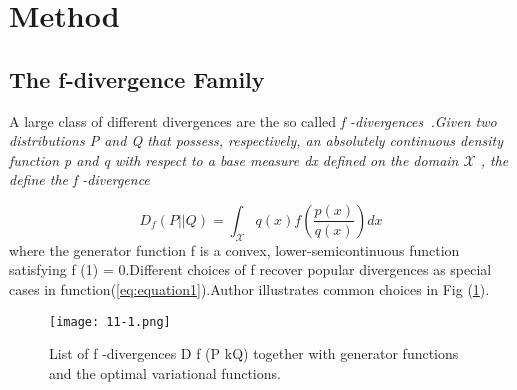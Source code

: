 \documentclass[10pt,letterpaper]{article}
\begin{document}
\section{Method}
\subsection{The f-divergence Family}
\upshape A large class of different divergences are the so called \itshape f \upshape -divergences~\cite{Information_2004_3,divergences_2006_4}.Given two distributions P and Q that possess, respectively, an absolutely continuous density function p and q with respect to a base measure dx defined on the domain $\mathcal{X}$ , the define the \itshape f \upshape -divergence\par
\begin{equation}
D_{f}(P||Q) = \int_{\mathcal{X}} q(x)f(\frac{p(x)}{q(x)}) dx
\label{eq:equation1}
\end{equation}
where the generator function f is a convex, lower-semicontinuous function satisfying f (1) = 0.Different choices of f recover popular divergences as special cases in function(\ref{eq:equation1}).Author illustrates common choices in Fig (\ref{fig:firstpicture}).
\begin{figure}[htb]
\centering
\texttt{[image: 11-1.png]}
\caption{List of f -divergences D f (P kQ) together with generator functions and the optimal variational functions.}
\label{fig:firstpicture}
\end{figure}
\end{document}
